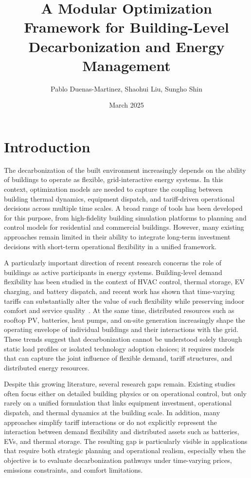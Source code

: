 \documentclass[11pt]{article}
\title{A Modular Optimization Framework for Building-Level Decarbonization and Energy Management}
\author{Pablo Duenas-Martinez, Shaohui Liu, Sungho Shin}
\date{March 2025}
\begin{document}
\maketitle

\tableofcontents

\clearpage
\section{Introduction}

The decarbonization of the built environment increasingly depends on the ability of buildings to operate as flexible, grid-interactive energy systems. In this context, optimization models are needed to capture the coupling between building thermal dynamics, equipment dispatch, and tariff-driven operational decisions across multiple time scales. A broad range of tools has been developed for this purpose, from high-fidelity building simulation platforms to planning and control models for residential and commercial buildings. However, many existing approaches remain limited in their ability to integrate long-term investment decisions with short-term operational flexibility in a unified framework.~\cite{crawley2001energyplus,trnsys,openstudio,designbuilder,simpkins2014reopt,anderson2017reopt,present2024resstock,parker2023comstock,wilson2022end}

A particularly important direction of recent research concerns the role of buildings as active participants in energy systems. Building-level demand flexibility has been studied in the context of HVAC control, thermal storage, EV charging, and battery dispatch, and recent work has shown that time-varying tariffs can substantially alter the value of such flexibility while preserving indoor comfort and service quality~\cite{moura2015demand,alimohammadisagvand2017influence,pallonetto2016effect,brahman2015optimal,korkas2022nearly,zhao2025dayahead,zhang2024optimal,wang2022designing}. At the same time, distributed resources such as rooftop PV, batteries, heat pumps, and on-site generation increasingly shape the operating envelope of individual buildings and their interactions with the grid. These trends suggest that decarbonization cannot be understood solely through static load profiles or isolated technology adoption choices; it requires models that can capture the joint influence of flexible demand, tariff structures, and distributed energy resources.

Despite this growing literature, several research gaps remain. Existing studies often focus either on detailed building physics or on operational control, but only rarely on a unified formulation that links equipment investment, operational dispatch, and thermal dynamics at the building scale. In addition, many approaches simplify tariff interactions or do not explicitly represent the interaction between demand flexibility and distributed assets such as batteries, EVs, and thermal storage. The resulting gap is particularly visible in applications that require both strategic planning and operational realism, especially when the objective is to evaluate decarbonization pathways under time-varying prices, emissions constraints, and comfort limitations.
\end{document}
